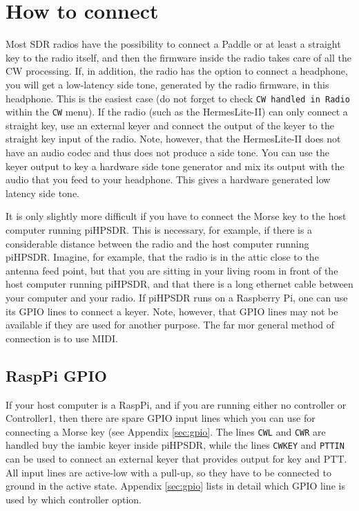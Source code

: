 \documentclass[12pt]{book}
\def\rett#1{\texttt{\color{red}#1}}
\def\bltt#1{\texttt{\color{blue}#1}}
\def\pH{pi\-HPSDR\xspace}
\begin{document}
\section{How to connect}
Most SDR radios have the possibility to connect a Paddle or at least a straight key to the
radio itself, and then the firmware inside the radio takes care of all the CW processing.
If, in addition, the radio has the option to  connect a headphone, you will get a low-latency
side tone, generated by the radio firmware, in this headphone.
This is the easiest case (do not forget to check \rett{CW handled in Radio} within the
\bltt{CW} menu).
If the radio (such as the HermesLite-II) can only connect a straight key,
use an external keyer and connect the output of the keyer to the straight key input of the radio.
Note, however, that the HermesLite-II does not have an audio codec and thus does not produce a
side tone. You can use the keyer output to key a hardware side tone generator and mix its
output with the audio that you feed to your headphone. This gives a hardware generated low
latency side tone.

It is only slightly more difficult if you have to connect the Morse key to the host computer running
\pH. This is necessary, for example, if there is a considerable distance between the
radio and the host computer running \pH. Imagine, for example, that the radio is
in the attic close to the antenna feed point, but that you are sitting in your living room
in front of the host computer running \pH, and that there is a long ethernet cable
between your computer and your radio. If \pH runs on a Raspberry Pi, one can use
its GPIO lines to connect a keyer. Note, however, that GPIO lines may not be available
if they are used for another purpose. The far mor general method of connection is to use MIDI.

\subsection{RaspPi GPIO}
If your host computer is a RaspPi, and if you are running either no controller
or Controller1, then there are spare GPIO input lines which you can use for connecting a Morse
key (see Appendix \ref{sec:gpio}. The lines \texttt{CWL} and \texttt{CWR} are handled buy
the iambic keyer inside \pH, while the lines \texttt{CWKEY} and \texttt{PTTIN} can be used
to connect an external keyer that provides output for key and PTT. All input lines are
active-low with a pull-up, so they have to be connected to ground in the active state.
Appendix \ref{sec:gpio} lists in detail which GPIO line
is used by which controller option.
\end{document}
